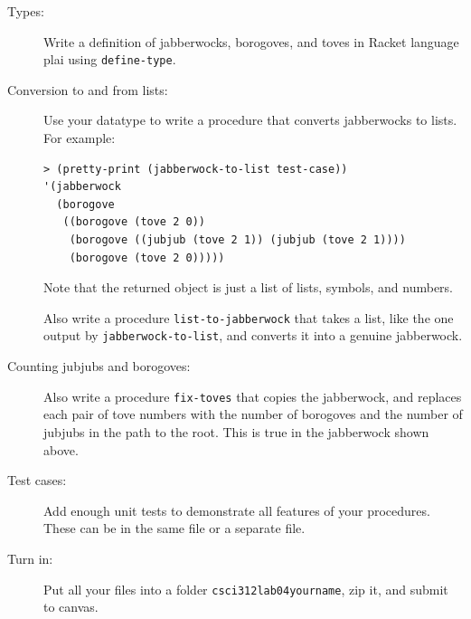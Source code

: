 \documentclass[11pt]{article}
\begin{document}
\hspace{-1cm}
\begin{description}

\item[Types:]
Write a
definition of jabberwocks, borogoves, and toves
 in Racket language plai using {\tt define-type}.  

\item[Conversion to and from lists:]
Use your datatype to write a  procedure that converts
jabberwocks to lists.  For example:
\begin{lstlisting}
> (pretty-print (jabberwock-to-list test-case))
'(jabberwock
  (borogove
   ((borogove (tove 2 0))
    (borogove ((jubjub (tove 2 1)) (jubjub (tove 2 1))))
    (borogove (tove 2 0)))))
\end{lstlisting}
Note that the returned object is just a list of lists, symbols, and numbers.

Also write a procedure {\tt list-to-jabberwock} that takes a list, like the
one output by {\tt jabberwock-to-list}, and converts it into a genuine
jabberwock.

\item[Counting jubjubs and borogoves:]
 Also write a procedure {\tt fix-toves} that copies the
jabberwock, and replaces each pair of tove numbers with 
the number of borogoves and the number of jubjubs in the path
to the root.  This is true in the
jabberwock shown above.

\item[Test cases:]  Add enough unit tests to demonstrate
all features of your procedures.  These can be in the same
file or a separate file.


\item[Turn in:] Put all your files into a folder {\tt csci312lab04yourname},
zip it, and submit to canvas.


\end{description}
\end{document}
